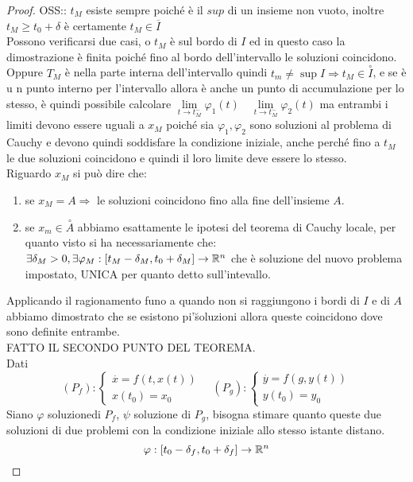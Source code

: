 \begin{proof}
	OSS:: $t_M$ esiste sempre poiché è il $sup$ di un insieme non vuoto, inoltre $t_M\ge t_0+\delta$ è certamente $t_M\in \overline{I}$\\
	Possono verificarsi due casi, o $t_M$ è sul bordo di $I$ ed in questo caso la dimostrazione è finita poiché fino al bordo dell'intervallo le soluzioni coincidono.
	Oppure $T_M$ è nella parte interna dell'intervallo quindi $t_m\ne\sup I\Rightarrow t_M\in\overset{\circ}{I}$, e se è u n punto interno per l'intervallo allora è anche un punto di accumulazione per lo stesso, è quindi possibile calcolare $\lim\limits_{t\to t_M^{-}}\varphi_1(t)\quad\lim\limits_{t\to t_M^{-}}\varphi_2(t)$ ma entrambi i limiti devono essere uguali a $x_M$ poiché sia $\varphi_1,\varphi_2$ sono soluzioni al problema  di Cauchy e devono quindi soddisfare la condizione iniziale, anche perché fino a $t_M$ le due soluzioni coincidono e quindi il loro limite deve essere lo stesso.\\
	Riguardo $x_M$ si può dire che:
	\begin{enumerate}
		\item se $x_M = A\Rightarrow$ le soluzioni coincidono fino alla fine dell'insieme $A$.
		\item se $x_m\in\overset{\circ}{A}$ abbiamo esattamente le ipotesi del teorema di Cauchy locale, per quanto visto si ha necessariamente che:\\
		$\exists \delta_M>0,\exists \varphi_M:\left[t_M-\delta_M,t_0+\delta_M\right]\to \mathbb{R}^n$ che è soluzione del nuovo problema impostato, UNICA per quanto detto sull'intevallo.
	\end{enumerate} 
	Applicando il ragionamento funo a quando non si raggiungono i bordi di $I$ e di $A$ abbiamo dimostrato che se esistono pi'\u soluzioni allora queste coincidono dove sono definite entrambe.\\
	FATTO IL SECONDO PUNTO DEL TEOREMA.\\
	Dati
	$$(P_f):\left\{\begin{matrix}\overset{\cdot}{x}=f(t,x(t))\\x(t_0)=x_{0}\end{matrix}\right.\quad	(P_g):\left\{\begin{matrix}\overset{\cdot}{y}=f(g,y(t))\\y(t_0)=y_{0}\end{matrix}\right.$$
	Siano $\varphi$ soluzionedi $P_f$, $\psi$ soluzione di $P_g$, bisogna stimare quanto queste due soluzioni di due problemi con la condizione iniziale allo stesso istante distano.
	$$\varphi:\left[t_0-\delta_f,t_0+\delta_f\right]\to \mathbb{R}^n$$

\end{proof}
